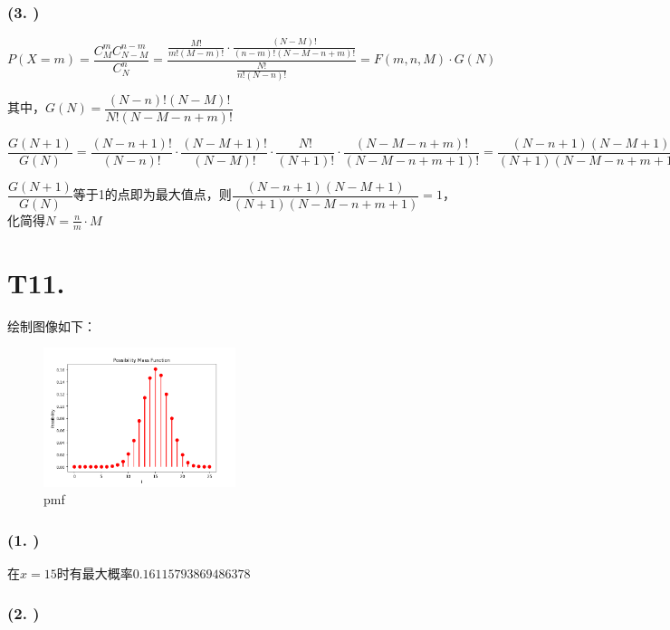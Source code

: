 \documentclass{article}
\newcommand\f[2]{\frac{#1}{#2}}
\newcommand\df[2]{\dfrac{#1}{#2}}
\begin{document}
\subsubsection*{(3. )}

$P(X=m)=\df{C_M^m C_{N-M}^{n-m}}{C_N^n}=\df{\f{M!}{m!(M-m)!}\cdot\f{(N-M)!}{(n-m)!(N-M-n+m)!}}{\f{N!}{n!(N-n)!}}=F(m,n,M)\cdot G(N)$

其中，$G(N)=\df{(N-n)!(N-M)!}{N!(N-M-n+m)!}$

$\df{G(N+1)}{G(N)}=\df{(N-n+1)!}{(N-n)!}\cdot\df{(N-M+1)!}{(N-M)!}\cdot\df{N!}{(N+1)!}\cdot\df{(N-M-n+m)!}{(N-M-n+m+1)!}=\df{(N-n+1)(N-M+1)}{(N+1)(N-M-n+m+1)}$

$\df{G(N+1)}{G(N)}$等于1的点即为最大值点，则$\df{(N-n+1)(N-M+1)}{(N+1)(N-M-n+m+1)}=1$，化简得$N=\f{n}{m}\cdot M$

\section*{T11. }

绘制图像如下：

\begin{center}
    \begin{figure}[H] %
        \centering %
        \includegraphics[width=0.5\textwidth]{img/Figure_1.png} %
        \caption{pmf} %
        \label{fig1} %
    \end{figure}
\end{center}

\subsubsection*{(1. )}

在$x=15$时有最大概率$0.16115793869486378$

\subsubsection*{(2. )}
\end{document}
